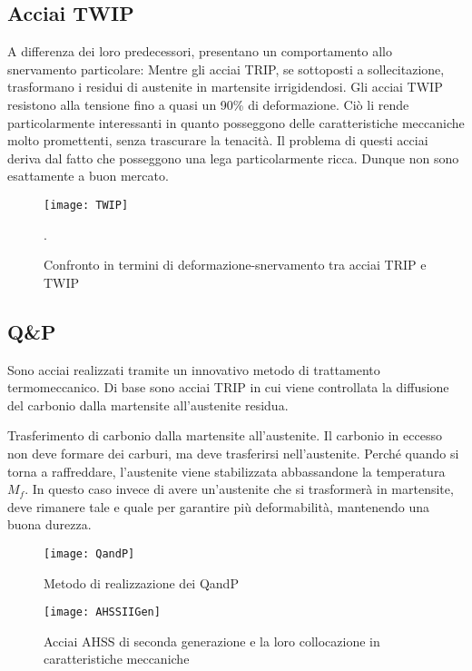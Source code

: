 \subsection{Acciai TWIP}
A differenza dei loro predecessori, presentano un comportamento allo snervamento particolare:
Mentre gli acciai \ac{TRIP}, se sottoposti a sollecitazione, trasformano i residui di 
austenite in martensite irrigidendosi. Gli acciai \ac{TWIP} resistono alla tensione fino a quasi
un 90\% di deformazione.
Ciò li rende particolarmente interessanti in quanto posseggono delle caratteristiche meccaniche 
molto promettenti, senza trascurare la tenacità.
Il problema di questi acciai deriva dal fatto che posseggono una lega particolarmente ricca.
Dunque non sono esattamente a buon mercato.

\begin{figure}
\centering
\texttt{[image: TWIP]}
\caption{Confronto in termini di deformazione-snervamento tra acciai \ac{TRIP} e \ac{TWIP}}.
\label{fig:TWIP}
\end{figure}

\subsection{Q\&P}
Sono acciai realizzati tramite un innovativo metodo di trattamento termomeccanico.
Di base sono acciai \ac{TRIP} in cui viene controllata la diffusione del carbonio
dalla martensite all'austenite residua.

Trasferimento di carbonio dalla martensite all'austenite.
Il carbonio in eccesso non deve formare dei carburi,  ma deve trasferirsi nell'austenite. Perché 
quando si torna a raffreddare, l'austenite viene stabilizzata abbassandone la temperatura $M_f$.
In questo caso invece di avere un'austenite che si trasformerà in martensite, deve rimanere tale e 
quale per garantire più deformabilità, mantenendo una buona durezza.

\begin{figure}
\centering
\texttt{[image: QandP]}
\caption{Metodo di realizzazione dei \ac{QandP}}
\label{fig:QandP}
\end{figure}

\begin{figure}
\centering
\texttt{[image: AHSSIIGen]}
\caption{Acciai \ac{AHSS} di seconda generazione e la loro collocazione in caratteristiche 
meccaniche}
\label{fig:AHSSIIGen}
\end{figure}